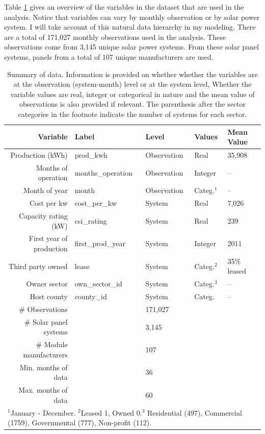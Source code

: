 \documentclass[a4paper]{article}
\begin{document}
Table \ref{tbl:variables} gives an overview of the variables in the dataset that are used in the analysis. Notice that variables can vary by monthly observation or by solar power system. I will take account of this natural data hierarchy in my modeling. There are a total of 171,027 monthly observations used in the analysis. These observations come from 3,145 unique solar power systems. From these solar panel systems, panels from a total of 107 unique manufacturers are used.

\begin{table}
  \caption{Summary of data. Information is provided on whether whether the variables are at the observation (system-month) level or at the system level, Whether the variable values are real, integer or categorical in nature and the mean value of observations is also provided if relevant. The parenthesis after the sector categories in the footnote indicate the number of systems for each sector.}
  \begin{tabular}{rllll}
  \toprule
    Variable &  Label &   Level & Values &   Mean Value  \\
    \midrule
    Production (kWh) &  prod\_kwh &  Observation & Real & 35,908   \\
    Months of operation &  months\_operation &  Observation & Integer & --   \\
    Month of year & month & Observation & Categ.$^{1}$& -- \\
    Cost per kw & cost\_per\_kw & System & Real & 7,026 \\
    Capacity rating (kW) & csi\_rating & System & Real & 239 \\
    First year of production & first\_prod\_year & System & Integer & 2011 \\
    Third party owned & lease & System & Categ.$^{2}$  &  35\% leased \\
    Owner sector & own\_sector\_id & System & Categ.$^{3}$& -- \\
    Host county & county\_id & System & Categ. & -- \\
    \midrule
    \# Observations && 171,027 && \\
    \# Solar panel systems && 3,145 && \\
    \# Module manufacturers && 107 && \\
     Min. months of data && 36 && \\
     Max. months of data && 60 && \\
  \bottomrule
    \multicolumn{5}{l}{\scriptsize{$^{1}$January - December. $^{2}$Leased 1, Owned 0.$^{3}$ Residential (497), Commercial (1759), Governmental (777), Non-profit (112).}}
  \end{tabular}
  \label{tbl:variables}
\end{table}
\end{document}
